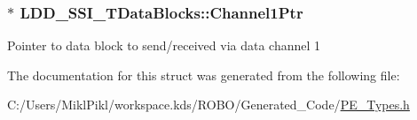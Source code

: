 \subsubsection[{Channel1\+Ptr}]{$\ast$ L\+D\+D\+\_\+\+S\+S\+I\+\_\+\+T\+Data\+Blocks\+::\+Channel1\+Ptr}\label{struct_l_d_d___s_s_i___t_data_blocks_a5c0e65fe82f88a245123217769316fef}
Pointer to data block to send/received via data channel 1 

The documentation for this struct was generated from the following file\+:\begin{DoxyCompactItemize}
\item 
C\+:/\+Users/\+Mikl\+Pikl/workspace.\+kds/\+R\+O\+B\+O/\+Generated\+\_\+\+Code/\hyperlink{_p_e___types_8h}{P\+E\+\_\+\+Types.\+h}\end{DoxyCompactItemize}
